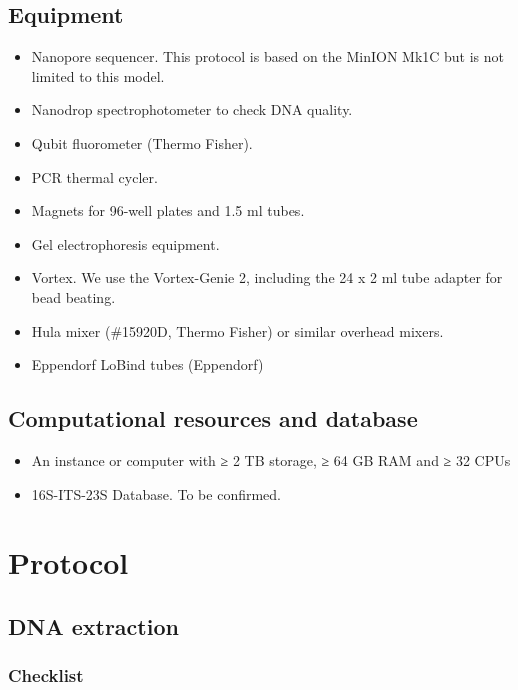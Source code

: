 \documentclass[
]{book}
\providecommand{\tightlist}{%
  \setlength{\itemsep}{0pt}\setlength{\parskip}{0pt}}
\begin{document}
\section{Equipment}\label{equipment}

\begin{itemize}
\tightlist
\item
  Nanopore sequencer. This protocol is based on the MinION Mk1C but is not limited to this model.
\item
  Nanodrop spectrophotometer to check DNA quality.
\item
  Qubit fluorometer (Thermo Fisher).
\item
  PCR thermal cycler.
\item
  Magnets for 96-well plates and 1.5 ml tubes.
\item
  Gel electrophoresis equipment.
\item
  Vortex. We use the Vortex-Genie 2, including the 24 x 2 ml tube adapter for bead beating.
\item
  Hula mixer (\#15920D, Thermo Fisher) or similar overhead mixers.
\item
  Eppendorf LoBind tubes (Eppendorf)
\end{itemize}

\section{Computational resources and database}\label{computational-resources-and-database}

\begin{itemize}
\tightlist
\item
  An instance or computer with ≥ 2 TB storage, ≥ 64 GB RAM and ≥ 32 CPUs
\item
  16S-ITS-23S Database. To be confirmed.
\end{itemize}

\chapter{Protocol}\label{protocol}

\section{DNA extraction}\label{dna-extraction}

\subsection{Checklist}\label{checklist}
\end{document}
